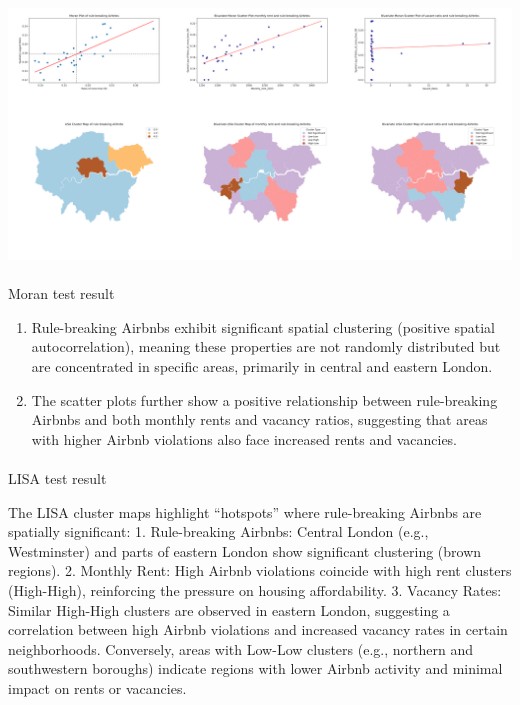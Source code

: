 \documentclass[
  a4paper,
  DIV=11,
  numbers=noendperiod]{scrartcl}
\makeatletter
\let\oldparagraph\paragraph
\renewcommand{\paragraph}{
    \@ifstar
      \xxxParagraphStar
      \xxxParagraphNoStar
  }
\newcommand{\xxxParagraphStar}[1]{\oldparagraph*{#1}\mbox{}}
\newcommand{\xxxParagraphNoStar}[1]{\oldparagraph{#1}\mbox{}}
\providecommand{\tightlist}{%
  \setlength{\itemsep}{0pt}\setlength{\parskip}{0pt}}\usepackage{longtable,booktabs,array}
\makeatother
\begin{document}
\includegraphics{plots/combined_of_Moran_and_LISA.png}

\paragraph{Moran test result}\label{moran-test-result}

\begin{enumerate}
\def\labelenumi{\arabic{enumi}.}
\tightlist
\item
  Rule-breaking Airbnbs exhibit significant spatial clustering (positive
  spatial autocorrelation), meaning these properties are not randomly
  distributed but are concentrated in specific areas, primarily in
  central and eastern London.
\item
  The scatter plots further show a positive relationship between
  rule-breaking Airbnbs and both monthly rents and vacancy ratios,
  suggesting that areas with higher Airbnb violations also face
  increased rents and vacancies.
\end{enumerate}

\paragraph{LISA test result}\label{lisa-test-result}

The LISA cluster maps highlight ``hotspots'' where rule-breaking Airbnbs
are spatially significant: 1. Rule-breaking Airbnbs: Central London
(e.g., Westminster) and parts of eastern London show significant
clustering (brown regions). 2. Monthly Rent: High Airbnb violations
coincide with high rent clusters (High-High), reinforcing the pressure
on housing affordability. 3. Vacancy Rates: Similar High-High clusters
are observed in eastern London, suggesting a correlation between high
Airbnb violations and increased vacancy rates in certain neighborhoods.
Conversely, areas with Low-Low clusters (e.g., northern and southwestern
boroughs) indicate regions with lower Airbnb activity and minimal impact
on rents or vacancies.
\end{document}
